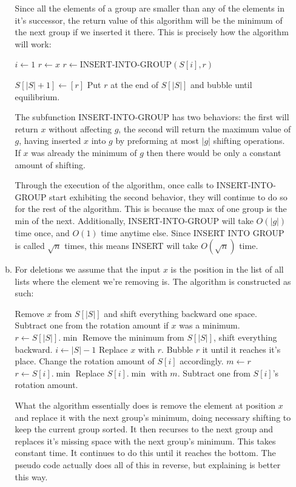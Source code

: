 \documentclass[letterpaper,10pt]{article}
\begin{document}
\begin{enumerate}
\begin{enumerate}[a)]
\begin{algorithmic}
		\EndFunction
		\end{algorithmic}
		Since all the elements of a group are smaller than any of the elements in it's successor, the return value of this algorithm will be the minimum of the next group if we inserted it there. This is precisely how the algorithm will work: 
		\begin{algorithmic}
			\State $i \gets 1$
			\State $r \gets x$
				\State $r \gets \text{INSERT-INTO-GROUP}(S[i], r)$
			\EndWhile

				\State $S[|S|+1] \gets [r]$
			\Else
				\State Put $r$ at the end of $S[|S|]$ and bubble until equilibrium.
			\EndIf
		\EndFunction
		\end{algorithmic}
		The subfunction INSERT-INTO-GROUP has two behaviors: the first will return $x$ without affecting $g$, the second will return the maximum value of $g$, having inserted $x$ into $g$ by preforming at most $|g|$ shifting operations. If $x$ was already the minimum of $g$ then there would be only a constant amount of shifting.

		Through the execution of the algorithm, once calls to INSERT-INTO-GROUP start exhibiting the second behavior, they will continue to do so for the rest of the algorithm. This is because the max of one group is the min of the next. Additionally, INSERT-INTO-GROUP will take $O(|g|)$ time once, and $O(1)$ time anytime else. Since INSERT INTO GROUP is called $\sqrt{n}$ times, this means INSERT will take $O(\sqrt{n})$ time.

		\item For deletions we assume that the input $x$ is the position in the list of all lists where the element we're removing is. The algorithm is constructed as such:

		\begin{algorithmic}
		\Function{DELETE}{$S$, $x$}
			\If{$x \in S[|S|]$}
				\State Remove $x$ from $S[|S|]$ and shift everything backward one space.
				\State Subtract one from the rotation amount if $x$ was a minimum.
				\State \Return
			\Else
				\State $r \gets S[|S|].\min$
				\State Remove the minimum from $S[|S|]$, shift everything backward.
				\State $i \gets |S|-1$
				\While{$i > 0$}
					\If{$x \in S[i]$}
						\State Replace $x$ with $r$.
						\State Bubble $r$ it until it reaches it's place.
						\State Change the rotation amount of $S[i]$ accordingly.
						\State \Return
					\Else
						\State $m \gets r$
						\State $r \gets S[i].\min$
						\State Replace $S[i].\min$ with $m$.
						\State Subtract one from $S[i]$'s rotation amount.
					\EndIf
				\EndWhile
			\EndIf
		\EndFunction
		\end{algorithmic}
		What the algorithm essentially does is remove the element at position $x$ and replace it with the next group's minimum, doing necessary shifting to keep the current group sorted. It then recurses to the next group and replaces it's missing space with the next group's minimum. This takes constant time. It continues to do this until it reaches the bottom. The pseudo code actually does all of this in reverse, but explaining is better this way.


\end{enumerate}
\end{enumerate}
\end{document}
